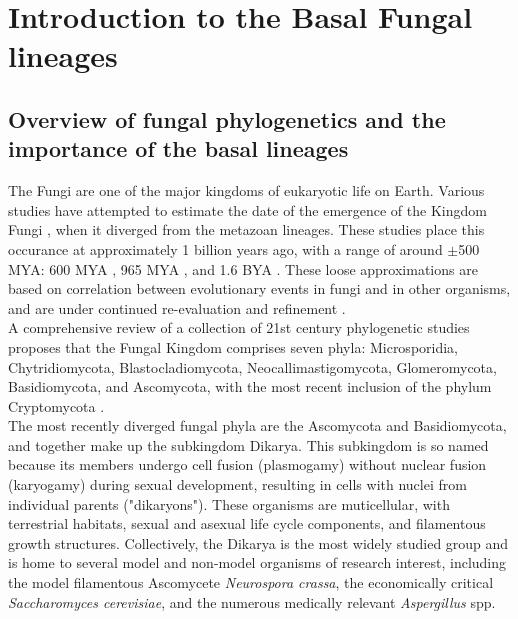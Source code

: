 \chapter{Introduction to the Basal Fungal lineages}
\section{Overview of fungal phylogenetics and the importance of the basal lineages}
The Fungi are one of the major kingdoms of eukaryotic life on Earth. Various studies have attempted to estimate the date of the emergence of the Kingdom Fungi \cite{Taylor2006}, when it diverged from the metazoan lineages. These studies place this occurance at approximately 1 billion years ago, with a range of around $\pm$500 MYA: 600 MYA \cite{Berbee1993}, 965 MYA \cite{Doolittle1996}, and 1.6 BYA \cite{Wang1999}. These loose approximations are based on correlation between evolutionary events in fungi and in other organisms, and are under continued re-evaluation and refinement \cite{Berbee2010}.\\
\indent A comprehensive review of a collection of 21st century phylogenetic studies \cite{Hibbett2007} proposes that the Fungal Kingdom comprises seven phyla: Microsporidia, Chytridiomycota, Blastocladiomycota, Neocallimastigomycota, Glomeromycota, Basidiomycota, and Ascomycota, with the most recent inclusion of the phylum Cryptomycota \cite{Jones2011}.\\
\indent The most recently diverged fungal phyla are the Ascomycota and Basidiomycota, and together make up the subkingdom Dikarya. This subkingdom is so named because its members undergo cell fusion (plasmogamy) without nuclear fusion (karyogamy) during sexual development, resulting in cells with nuclei from individual parents ("dikaryons"). These organisms are muticellular, with terrestrial habitats, sexual and asexual life cycle components, and filamentous growth structures. Collectively, the Dikarya is the most widely studied group and is home to several model and non-model organisms of research interest, including the model filamentous Ascomycete \textit{Neurospora crassa}, the economically critical \textit{Saccharomyces cerevisiae}, and the numerous medically relevant \textit{Aspergillus} spp.\\
